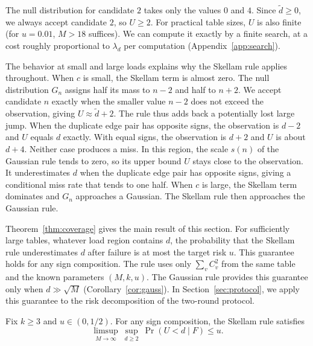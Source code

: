 The null distribution for candidate $2$ takes only the values $0$ and $4$. Since $\widetilde d\ge0$, we always accept candidate $2$, so $U\ge2$. For practical table sizes, $U$ is also finite (for $u=0.01$, $M>18$ suffices). We can compute it exactly by a finite search, at a cost roughly proportional to $\lambda_d$ per computation (Appendix~\ref{app:search}).

The behavior at small and large loads explains why the Skellam rule applies throughout. When $c$ is small, the Skellam term is almost zero. The null distribution $G_n$ assigns half its mass to $n-2$ and half to $n+2$. We accept candidate $n$ exactly when the smaller value $n-2$ does not exceed the observation, giving $U\approx\widetilde d+2$. The rule thus adds back a potentially lost large jump. When the duplicate edge pair has opposite signs, the observation is $d-2$ and $U$ equals $d$ exactly. With equal signs, the observation is $d+2$ and $U$ is about $d+4$. Neither case produces a miss. In this region, the scale $s(n)$ of the Gaussian rule tends to zero, so its upper bound $U$ stays close to the observation. It underestimates $d$ when the duplicate edge pair has opposite signs, giving a conditional miss rate that tends to one half. When $c$ is large, the Skellam term dominates and $G_n$ approaches a Gaussian. The Skellam rule then approaches the Gaussian rule.

Theorem~\ref{thm:coverage} gives the main result of this section. For sufficiently large tables, whatever load region contains $d$, the probability that the Skellam rule underestimates $d$ after failure is at most the target risk $u$. This guarantee holds for any sign composition. The rule uses only $\sum_vC_v^2$ from the same table and the known parameters $(M,k,u)$. The Gaussian rule provides this guarantee only when $d\gg\sqrt M$ (Corollary~\ref{cor:gauss}). In Section~\ref{sec:protocol}, we apply this guarantee to the risk decomposition of the two-round protocol.

\begin{theorem}\label{thm:coverage}
Fix $k\ge3$ and $u\in(0,1/2)$. For any sign composition, the Skellam rule satisfies
\begin{equation}
\limsup_{M\to\infty}\ \sup_{d\ge2}\ \Pr(U<d\mid F)\le u.\label{eq:coverage}
\end{equation}
\end{theorem}

